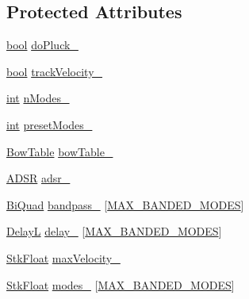 \subsection*{Protected Attributes}
\begin{DoxyCompactItemize}
\item 
\hyperlink{mac_2config_2i386_2lib-src_2libsoxr_2soxr-config_8h_abb452686968e48b67397da5f97445f5b}{bool} \hyperlink{class_nyq_1_1_banded_w_g_ad120ba811356809a4404f9d77213b3f9}{do\+Pluck\+\_\+}
\item 
\hyperlink{mac_2config_2i386_2lib-src_2libsoxr_2soxr-config_8h_abb452686968e48b67397da5f97445f5b}{bool} \hyperlink{class_nyq_1_1_banded_w_g_a6ed759facb46aa83bc572bcb3c9e760c}{track\+Velocity\+\_\+}
\item 
\hyperlink{xmltok_8h_a5a0d4a5641ce434f1d23533f2b2e6653}{int} \hyperlink{class_nyq_1_1_banded_w_g_ab0cf576013d5ef3ef211ad6f2773ac8c}{n\+Modes\+\_\+}
\item 
\hyperlink{xmltok_8h_a5a0d4a5641ce434f1d23533f2b2e6653}{int} \hyperlink{class_nyq_1_1_banded_w_g_aa7f02c8ef5e1e3a7091552b2ff9cd125}{preset\+Modes\+\_\+}
\item 
\hyperlink{class_nyq_1_1_bow_table}{Bow\+Table} \hyperlink{class_nyq_1_1_banded_w_g_ac0234d1c1d5575efb283321e11f2e938}{bow\+Table\+\_\+}
\item 
\hyperlink{class_nyq_1_1_a_d_s_r}{A\+D\+SR} \hyperlink{class_nyq_1_1_banded_w_g_a8eeefb6c427d71374b879a8016b09f36}{adsr\+\_\+}
\item 
\hyperlink{class_nyq_1_1_bi_quad}{Bi\+Quad} \hyperlink{class_nyq_1_1_banded_w_g_acc292b275ed609a8d27d9a2e1976bde1}{bandpass\+\_\+} \mbox{[}\hyperlink{namespace_nyq_a3b6b7f1245b5eed8518a8240035c74cb}{M\+A\+X\+\_\+\+B\+A\+N\+D\+E\+D\+\_\+\+M\+O\+D\+ES}\mbox{]}
\item 
\hyperlink{class_nyq_1_1_delay_l}{DelayL} \hyperlink{class_nyq_1_1_banded_w_g_a10fa4c5628882bdf654c34e75064e6f0}{delay\+\_\+} \mbox{[}\hyperlink{namespace_nyq_a3b6b7f1245b5eed8518a8240035c74cb}{M\+A\+X\+\_\+\+B\+A\+N\+D\+E\+D\+\_\+\+M\+O\+D\+ES}\mbox{]}
\item 
\hyperlink{namespace_nyq_a044fa20a706520a617bbbf458a7db7e4}{Stk\+Float} \hyperlink{class_nyq_1_1_banded_w_g_ae880f21388edcd26c7ff5f3201e156b9}{max\+Velocity\+\_\+}
\item 
\hyperlink{namespace_nyq_a044fa20a706520a617bbbf458a7db7e4}{Stk\+Float} \hyperlink{class_nyq_1_1_banded_w_g_a7052255bbc2cc61b6ab5257415aac1da}{modes\+\_\+} \mbox{[}\hyperlink{namespace_nyq_a3b6b7f1245b5eed8518a8240035c74cb}{M\+A\+X\+\_\+\+B\+A\+N\+D\+E\+D\+\_\+\+M\+O\+D\+ES}\mbox{]}

\end{DoxyCompactItemize}
